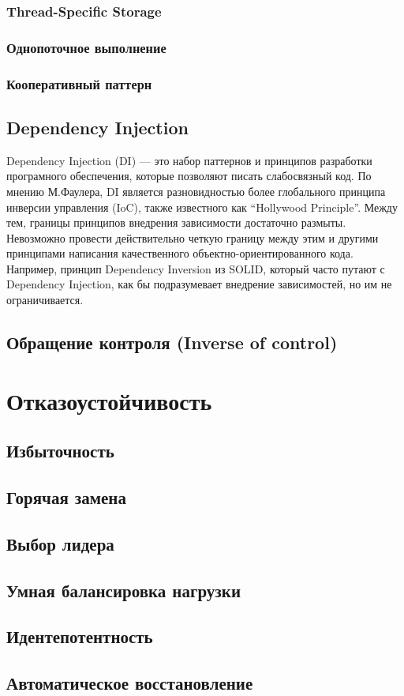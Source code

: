\subsection{Thread-Specific Storage}
\subsection{Однопоточное выполнение}
\subsection{Кооперативный паттерн}

\section{Dependency Injection}
Dependency Injection (DI) — это набор паттернов и принципов разработки програмного обеспечения, которые позволяют писать слабосвязный код. По мнению М.Фаулера, DI является разновидностью более глобального принципа инверсии управления (IoC), также известного как “Hollywood Principle”. Между тем, границы принципов внедрения зависимости достаточно размыты. Невозможно провести действительно четкую границу между этим и другими принципами написания качественного объектно-ориентированного кода. Например, принцип Dependency Inversion из SOLID, который часто путают с Dependency Injection, как бы подразумевает внедрение зависимостей, но им не ограничивается.

\section{Обращение контроля (Inverse of control)}

\chapter{Отказоустойчивость}

\section{Избыточность}
\section{Горячая замена}
\section{Выбор лидера}
\section{Умная балансировка нагрузки}
\section{Идентепотентность}
\section{Автоматическое восстановление}
